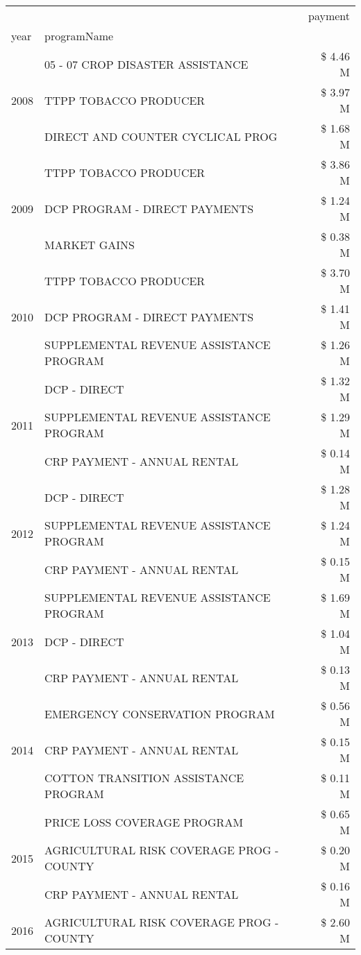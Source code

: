 \begin{tabular}{llr}
\toprule
 &  & payment \\
year & programName &  \\
\midrule
\multirow[t]{3}{*}{2008} & 05 - 07 CROP DISASTER ASSISTANCE & \$ 4.46 M \\
 & TTPP TOBACCO PRODUCER & \$ 3.97 M \\
 & DIRECT AND COUNTER CYCLICAL PROG & \$ 1.68 M \\
\cline{1-3}
\multirow[t]{3}{*}{2009} & TTPP TOBACCO PRODUCER & \$ 3.86 M \\
 & DCP PROGRAM - DIRECT PAYMENTS & \$ 1.24 M \\
 & MARKET GAINS & \$ 0.38 M \\
\cline{1-3}
\multirow[t]{3}{*}{2010} & TTPP TOBACCO PRODUCER & \$ 3.70 M \\
 & DCP PROGRAM - DIRECT PAYMENTS & \$ 1.41 M \\
 & SUPPLEMENTAL REVENUE ASSISTANCE PROGRAM & \$ 1.26 M \\
\cline{1-3}
\multirow[t]{3}{*}{2011} & DCP - DIRECT & \$ 1.32 M \\
 & SUPPLEMENTAL REVENUE ASSISTANCE PROGRAM & \$ 1.29 M \\
 & CRP PAYMENT - ANNUAL RENTAL & \$ 0.14 M \\
\cline{1-3}
\multirow[t]{3}{*}{2012} & DCP - DIRECT & \$ 1.28 M \\
 & SUPPLEMENTAL REVENUE ASSISTANCE PROGRAM & \$ 1.24 M \\
 & CRP PAYMENT - ANNUAL RENTAL & \$ 0.15 M \\
\cline{1-3}
\multirow[t]{3}{*}{2013} & SUPPLEMENTAL REVENUE ASSISTANCE PROGRAM & \$ 1.69 M \\
 & DCP - DIRECT & \$ 1.04 M \\
 & CRP PAYMENT - ANNUAL RENTAL & \$ 0.13 M \\
\cline{1-3}
\multirow[t]{3}{*}{2014} & EMERGENCY CONSERVATION PROGRAM & \$ 0.56 M \\
 & CRP PAYMENT - ANNUAL RENTAL & \$ 0.15 M \\
 & COTTON TRANSITION ASSISTANCE PROGRAM & \$ 0.11 M \\
\cline{1-3}
\multirow[t]{3}{*}{2015} & PRICE LOSS COVERAGE PROGRAM & \$ 0.65 M \\
 & AGRICULTURAL RISK COVERAGE PROG - COUNTY & \$ 0.20 M \\
 & CRP PAYMENT - ANNUAL RENTAL & \$ 0.16 M \\
\cline{1-3}
\multirow[t]{3}{*}{2016} & AGRICULTURAL RISK COVERAGE PROG - COUNTY & \$ 2.60 M \\

\end{tabular}
